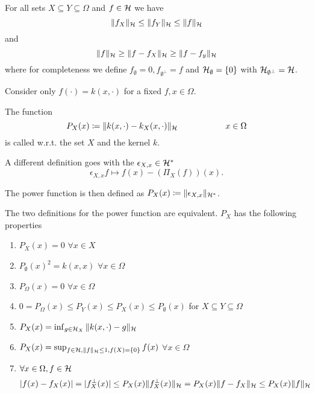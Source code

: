 \begin{corollary}\label{cor:1.20}
    For all sets $X\subseteq Y\subseteq \Omega$ and $f\in \mathcal{H}$ we have 
    \[\Vert f_X\Vert_{\mathcal{H}}\leq \Vert f_Y\Vert_{\mathcal{H}} \leq \Vert f\Vert_{\mathcal{H}}\]
    and 
    \[\Vert f\Vert_{\mathcal{H}}\geq \Vert f-f_X\Vert_{\mathcal{H}}\geq\Vert f-f_y\Vert_{\mathcal{H}}\]
    where for completeness we define $f_\emptyset=0,f_{\emptyset^\perp}=f$ and 
    $\mathcal{H}_{\emptyset}=\{0\}$ with $\mathcal{H}_{\emptyset^\perp}=\mathcal{H}$.
\end{corollary}



Consider only $f(\cdot)=k(x,\cdot)$ for a fixed $f,x\in\Omega$.

\begin{definition}\label{def:2.1:power_function}
    The function \[P_X(x)\coloneqq \Vert k(x,\cdot)-k_X(x,\cdot)\Vert_{\mathcal{H}}\hspace{2cm} x\in\Omega\]
    is called  w.r.t. the set $X$ and the kernel $k$.

    A different definition goes with the  $\epsilon_{X,x}\in\mathcal{H}^*$
    \[\epsilon_{X,x} f\mapsto f(x)-(\Pi_X(f))(x).\]

    The power function is then defined as $P_X(x)\coloneqq \Vert \epsilon_{X,x}\Vert_{\mathcal{H}^*}$.
\end{definition}

\begin{theorem}\label{thm:2.2}
    The two definitions for the power function are equivalent. 
    $P_X$ has the following properties
    \begin{enumerate}
        \item $P_X(x)=0$ $\forall x\in X$
        \item $P_\emptyset(x)^2=k(x,x)$ $\forall x\in \Omega$
        \item $P_\Omega(x)=0$ $\forall x\in\Omega$
        \item $0=P_\Omega(x)\leq P_Y(x)\leq P_X(x)\leq P_\emptyset(x)$ for $X\subseteq Y\subseteq \Omega$
        \item $P_X(x)=\inf_{g\in\mathcal{H}_X} \Vert k(x,\cdot)-g\Vert_{\mathcal{H}}$ 
        \item $P_X(x)=\sup_{f\in\mathcal{H},\Vert f\Vert_{\mathcal{H}} \leq 1,f(X)=\{0\}} f(x)$ $\forall x\in\Omega$
        \item $\forall x\in \Omega,f\in\mathcal{H}$\[|f(x)-f_X(x)|=\vert f_X^\perp(x)\vert\leq P_X(x)\Vert f_X^\perp(x)\Vert_{\mathcal{H}}= P_X(x)\Vert f-f_X\Vert_{\mathcal{H}}\leq P_X(x)\Vert f\Vert_{\mathcal{H}}\]
    \end{enumerate}
\end{theorem}

